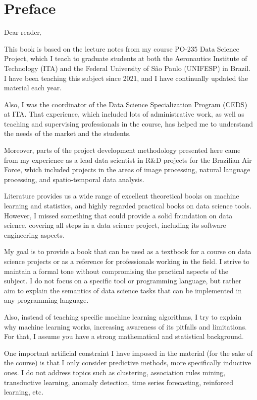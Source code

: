 \chapter{Preface}

\noindent Dear reader, \vspace{1em}

This book is based on the lecture notes from my course PO-235 Data Science Project, which
I teach to graduate students at both the Aeronautics Institute of Technology (ITA) and the
Federal University of São Paulo (UNIFESP) in Brazil.  I have been teaching this subject
since 2021, and I have continually updated the material each year.

Also, I was the coordinator of the Data Science Specialization Program (CEDS) at ITA.
That experience, which included lots of administrative work, as well as teaching and
supervising professionals in the course, has helped me to understand the needs of the
market and the students.

Moreover, parts of the project development methodology presented here came from my
experience as a lead data scientist in R\&D projects for the Brazilian Air Force,
which included projects in the areas of image processing, natural language processing,
and spatio-temporal data analysis.

Literature provides us a wide range of excellent theoretical books on machine learning and
statistics, and highly regarded practical books on data science tools.  However, I missed
something that could provide a solid foundation on data science, covering all steps in a
data science project, including its software engineering aspects.

My goal is to provide a book that can be used as a textbook for a course on data science
projects or as a reference for professionals working in the field.  I strive to maintain a
formal tone without compromising the practical aspects of the subject.  I do not focus on
a specific tool or programming language, but rather aim to explain the semantics of data
science tasks that can be implemented in any programming language.

Also, instead of teaching specific machine learning algorithms, I try to explain why
machine learning works, increasing awareness of its pitfalls and limitations. For that, I
assume you have a strong mathematical and statistical background.

One important artificial constraint I have imposed in the material (for the sake of the
course) is that I only consider predictive methods, more specifically inductive ones. I do
not address topics such as clustering, association rules mining, transductive learning,
anomaly detection, time series forecasting, reinforced learning, etc.

